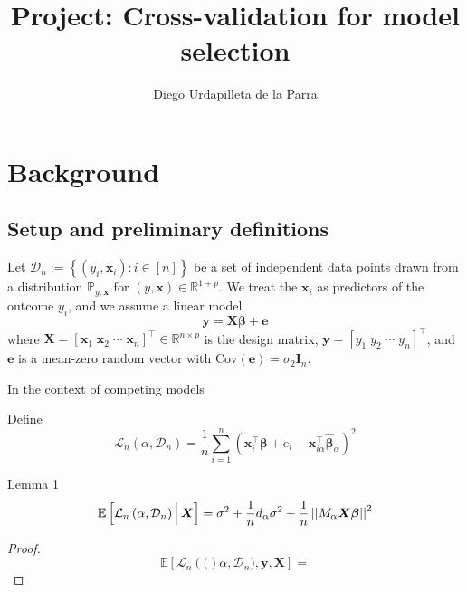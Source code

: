 \documentclass[12pt, letter paper]{article}
\title{Project: Cross-validation for model selection}
\author{Diego Urdapilleta de la Parra}
\newcommand{\1}{\mathmybb{1}}
\newcommand{\R}{\mathbb{R}}
\newcommand{\0}{\emptyset}
\newcommand{\prob}{\mathbb{P}}
\newcommand{\Ep}[1]{\mathbb{E}\left[ #1 \right]}
\newcommand{\paren}[1]{\left(#1 \right)}
\newcommand{\sqbr}[1]{\left[#1 \right]}
\newcommand{\set}[1]{\left\{ #1 \right\}}
\newcommand{\norm}[1]{\left|\hspace{0.05pt}\left|#1 \right|\hspace{0.05pt}\right|}
\newcommand{\data}{\mathcal{D}_{n}}
\newcommand{\X}{\boldsymbol{X}}
\newcommand{\x}{\boldsymbol{x}}
\renewcommand{\xi}{\x_{i}}
\newcommand{\y}{\boldsymbol{y}}
\newcommand{\e}{\boldsymbol{e}}
\newcommand{\Cov}[1]{\mathrm{Cov}\paren{#1}}
\newcommand{\bbeta}{\boldsymbol{\beta}}
\newcommand{\bbetahat}{\boldsymbol{\hat{\beta}}}
\newcommand{\Loss}[1]{\mathcal{L}_{n}\paren{#1}}
\begin{document}
%
\maketitle

\section*{Background}
\subsection*{Setup and preliminary definitions}

Let \(\data := \set{\paren{y_{i}, \x_{i}}:i\in [n]}\) be a set of independent data points drawn from a distribution \(\prob_{y, \x}\) for \((y, \x)\in\R^{1+p}\). We treat the \(\x_{i}\) as predictors of the outcome \(y_{i}\), and we assume a linear model
\[\y = \X\bbeta + \e\]
where \(\X = {[\x_{1}\;\x_{2}\;\cdots\;\x_{n}]}^{\top}\in\R^{n\times p}\) is the design matrix, \(\y = \sqbr{y_{1}\; y_{2}\;\cdots\; y_{n}}^{\top}\), and \(\e\) is a mean-zero random vector with \(\Cov{\e} = \sigma_{2}\boldsymbol{I}_{n}\).

In the context of competing models 

Define
\[\Loss{\alpha, \data} = \frac{1}{n}\sum_{i=1}^{n}\paren{\xi^{\top}\bbeta + e_{i} - \x_{i\alpha}^{\top}\bbetahat_{\alpha}}^{2}\]

\begin{prop}{Lemma 1}
    \[\Ep{\Loss{\alpha, \data}\Big|\,\X} = \sigma^{2} + \frac{1}{n}d_{\alpha}\sigma^{2} + \frac{1}{n}\norm{M_{\alpha}\X\bbeta}^{2}\]
\end{prop}
\begin{proof}
    \[\Ep{\Loss(\alpha, \data), \y, \X} = \]
\end{proof}






 
\end{document}
